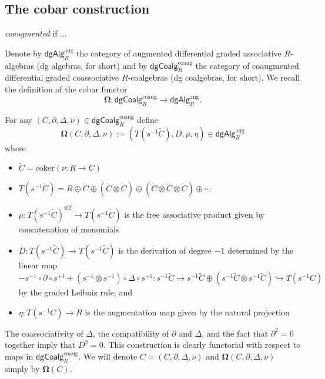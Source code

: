 

\subsection{The cobar construction}


\textit{coaugmented} if ... 

Denote by $\mathsf{dgAlg}^{\text{aug}}_R$ the category of augmented differential graded associative $R$-algebras (dg algebras, for short) and by $\mathsf{dgCoalg}^{\text{coaug}}_R$ the category of coaugmented differential graded coassociative $R$-coalgebras (dg coalgebras, for short). We recall the definition of the cobar functor 
$$\mathbf{\Omega}: \mathsf{dgCoalg}^{\text{coaug}}_R \to \mathsf{dgAlg}^{\text{aug}}_R.$$

For any $(C, \partial, \Delta, \nu)  \in \mathsf{dgCoalg}^{\text{coaug}}_R$ define
$$\mathbf{\Omega}(C, \partial, \Delta, \nu) := ( T(s^{-1}  \widetilde{C} ), D, \mu, \eta) \in \mathsf{dgAlg}^{\text{aug}}_R$$ where 
\begin{itemize}
\item $\widetilde{C}=\text{coker}(\nu: R \to C)$
\item $T(s^{-1} \widetilde{C})= R \oplus \widetilde{C} \oplus (\widetilde{C}  \otimes \widetilde{C} ) \oplus ( \widetilde{C} \otimes \widetilde{C} \otimes \widetilde{C} ) \oplus\cdots $
\item $\mu: T(s^{-1}  \widetilde{C} )^{\otimes 2} \to T(s^{-1}  \widetilde{C} ) $ is the free associative product given by concatenation of monomials
\item $D: T(s^{-1}  \widetilde{C} ) \to T(s^{-1}  \widetilde{C} )$ is the derivation of degree $-1$ determined by the linear map $$- s^{-1} \circ \partial \circ s^{+1} + (s^{-1} \otimes s^{-1}) \circ \Delta \circ s^{+1}: s^{-1}\widetilde{C} \to s^{-1}\widetilde{C} \oplus (s^{-1}\widetilde{C} \otimes s^{-1}\widetilde{C}) \hookrightarrow T(s^{-1}C)$$  by the graded Leibniz rule, and
\item $\eta: T(s^{-1}C) \to R$ is the augmentation map given by the natural projection
\end{itemize}

The coassociativity of $\Delta$, the compatibility of $\partial$ and $\Delta$, and the fact that $\partial^2 =0$ together imply that $D^2=0$. This construction is clearly functorial with respect to maps in $\mathsf{dgCoalg}^{\text{coaug}}_R$. We will denote $C=(C, \partial, \Delta, \nu)$ and $\mathbf{\Omega} (C, \partial, \Delta, \nu)$ simply by $\mathbf{\Omega}(C)$. 

